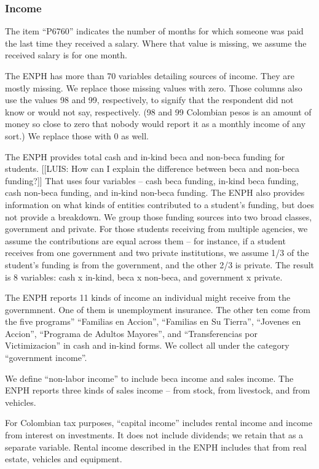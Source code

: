 \documentclass[12pt]{article}
\begin{document}
\begin{appendices}
\subsubsection{Income}
The item ``P6760'' indicates the number of months for which someone was paid the last time they received a salary.
Where that value is missing, we assume the received salary is for one month.

The ENPH has more than 70 variables detailing sources of income.
They are mostly missing.
We replace those missing values with zero.
Those columns also use the values 98 and 99, respectively, to signify that the respondent did not know or would not say, respectively.
(98 and 99 Colombian pesos is an amount of money so close to zero that nobody would report it as a monthly income of any sort.)
We replace those with 0 as well.

The ENPH provides total cash and in-kind beca and non-beca funding for students.
[[LUIS: How can I explain the difference between beca and non-beca funding?]]
That uses four variables -- cash beca funding, in-kind beca funding, cash non-beca funding, and in-kind non-beca funding.
The ENPH also provides information on what kinds of entities contributed to a student's funding, but does not provide a breakdown.
We group those funding sources into two broad classes, government and private.
For those students receiving from multiple agencies, we assume the contributions are equal across them -- for instance, if a student receives from one government and two private institutions, we assume 1/3 of the student's funding is from the government, and the other 2/3 is private.
The result is 8 variables: cash x in-kind, beca x non-beca, and government x private.

The ENPH reports 11 kinds of income an individual might receive from the governmnent.
One of them is unemployment insurance.
The other ten come from the five programs''
``Familias en Accion'',
``Familias en Su Tierra'',
``Jovenes en Accion'',
``Programa de Adultos Mayores'', and
``Transferencias por Victimizacion''
in cash and in-kind forms.
We collect all under the category ``government income''.

We define ``non-labor income'' to include beca income and sales income.
The ENPH reports three kinds of sales income -- from stock, from livestock, and from vehicles.

For Colombian tax purposes, ``capital income'' includes rental income and income from interest on investments.
It does not include dividends; we retain that as a separate variable.
Rental income described in the ENPH includes that from real estate, vehicles and equipment.


\end{appendices}
\end{document}
